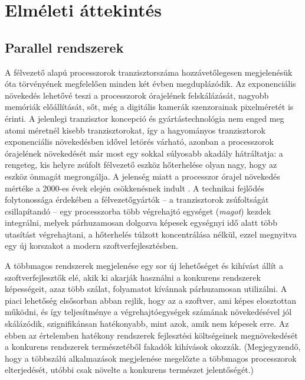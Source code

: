 \chapter{Elméleti áttekintés}

\section{Parallel rendszerek}

A félvezető alapú processzorok tranzisztorszáma hozzávetőlegesen megjelenésük óta \cite{Moore} törvényének megfelelően minden két évben megduplázódik. Az exponenciális növekedés lehetővé teszi a processzorok órajelének felskálázását, nagyobb memóriák előállítását, sőt, még a digitális kamerák szenzorainak pixelméretét is érinti. A jelenlegi tranzisztor koncepció és gyártástechnológia nem enged meg atomi méretnél kisebb tranzisztorokat, így a hagyományos tranzisztorok exponenciális növekedésben idővel letörés várható, azonban a processzorok órajelének növekedését már most egy sokkal súlyosabb akadály hátráltatja: a rengeteg, kis helyre zsúfolt félvezető eszköz hőterhelése olyan nagy, hogy az eszköz önmagát megrongálja. A jelenség miatt a processzor órajel növekedés mértéke a 2000-es évek elején csökkenésnek indult \cite{CMOS-VLSI}. A technikai fejlődés folytonossága érdekében a félvezetőgyártók -- a tranzisztorok zsúfoltságát csillapítandó -- egy processzorba több végrehajtó egységet (\emph{magot}) kezdek integrálni, melyek párhuzamosan dolgozva képesek egységnyi idő alatt több utasítást végrehajtani, a hőterhelés túlzott koncentrálása nélkül, ezzel megnyitva egy új korszakot a modern szoftverfejlesztésben.

    A többmagos rendszerek megjelenése egy sor új lehetőséget és kihívást állít a szoftverfejlesztők elé, akik ki akarják használni a konkurens rendszerek képességeit, azaz több szálat, folyamatot kívánnak párhuzamosan utilizálni. A piaci lehetőség elsősorban abban rejlik, hogy az a szoftver, ami képes elosztottan működni, és így teljesítménye a végrehajtóegységek számának növekedésével jól skálázódik, szignifikánsan hatékonyabb, mint azok, amik nem képesek erre. Az ebben az értelemben hatékony rendszerek fejlesztési költségeinek megnövekedését a konkurens rendszerek természetéből fakadók kihívások okozzák. (Megjegyzendő, hogy a többszálú alkalmazások megjelenése megelőzte a többmagos processzorok elterjedését, utóbbi csak növelte a konkurens természet jelentőségét.)
    
